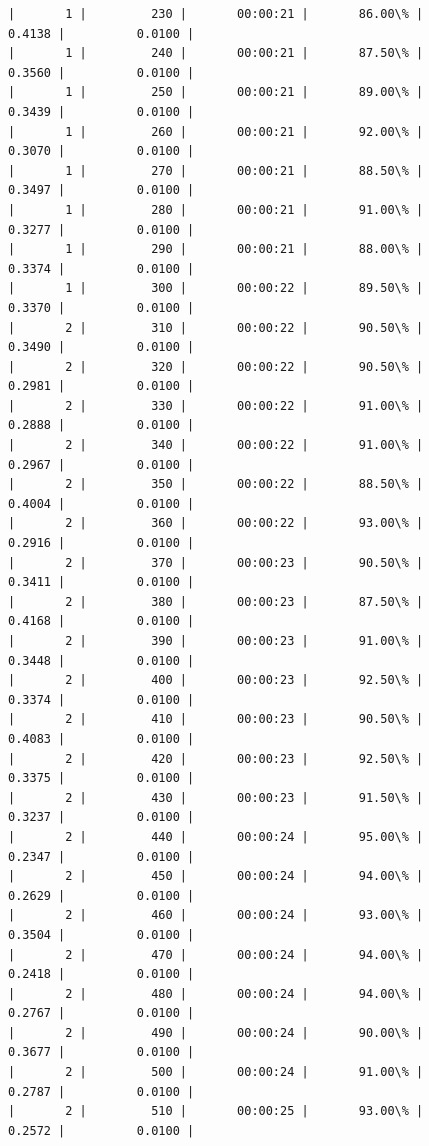 \documentclass[11pt]{article}
\begin{document}
\begin{Verbatim}[commandchars=\\\{\}]
|       1 |         230 |       00:00:21 |       86.00\% |       0.4138 |          0.0100 |
|       1 |         240 |       00:00:21 |       87.50\% |       0.3560 |          0.0100 |
|       1 |         250 |       00:00:21 |       89.00\% |       0.3439 |          0.0100 |
|       1 |         260 |       00:00:21 |       92.00\% |       0.3070 |          0.0100 |
|       1 |         270 |       00:00:21 |       88.50\% |       0.3497 |          0.0100 |
|       1 |         280 |       00:00:21 |       91.00\% |       0.3277 |          0.0100 |
|       1 |         290 |       00:00:21 |       88.00\% |       0.3374 |          0.0100 |
|       1 |         300 |       00:00:22 |       89.50\% |       0.3370 |          0.0100 |
|       2 |         310 |       00:00:22 |       90.50\% |       0.3490 |          0.0100 |
|       2 |         320 |       00:00:22 |       90.50\% |       0.2981 |          0.0100 |
|       2 |         330 |       00:00:22 |       91.00\% |       0.2888 |          0.0100 |
|       2 |         340 |       00:00:22 |       91.00\% |       0.2967 |          0.0100 |
|       2 |         350 |       00:00:22 |       88.50\% |       0.4004 |          0.0100 |
|       2 |         360 |       00:00:22 |       93.00\% |       0.2916 |          0.0100 |
|       2 |         370 |       00:00:23 |       90.50\% |       0.3411 |          0.0100 |
|       2 |         380 |       00:00:23 |       87.50\% |       0.4168 |          0.0100 |
|       2 |         390 |       00:00:23 |       91.00\% |       0.3448 |          0.0100 |
|       2 |         400 |       00:00:23 |       92.50\% |       0.3374 |          0.0100 |
|       2 |         410 |       00:00:23 |       90.50\% |       0.4083 |          0.0100 |
|       2 |         420 |       00:00:23 |       92.50\% |       0.3375 |          0.0100 |
|       2 |         430 |       00:00:23 |       91.50\% |       0.3237 |          0.0100 |
|       2 |         440 |       00:00:24 |       95.00\% |       0.2347 |          0.0100 |
|       2 |         450 |       00:00:24 |       94.00\% |       0.2629 |          0.0100 |
|       2 |         460 |       00:00:24 |       93.00\% |       0.3504 |          0.0100 |
|       2 |         470 |       00:00:24 |       94.00\% |       0.2418 |          0.0100 |
|       2 |         480 |       00:00:24 |       94.00\% |       0.2767 |          0.0100 |
|       2 |         490 |       00:00:24 |       90.00\% |       0.3677 |          0.0100 |
|       2 |         500 |       00:00:24 |       91.00\% |       0.2787 |          0.0100 |
|       2 |         510 |       00:00:25 |       93.00\% |       0.2572 |          0.0100 |

\end{Verbatim}
\end{document}
